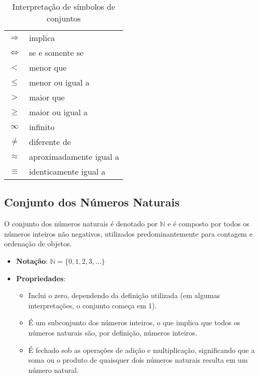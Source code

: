 \documentclass[a4paper,12pt]{article}  %
\begin{document}
\begin{table}[h]
\begin{tabularx}{\textwidth}{|c|X|}
        \( \Rightarrow \)     & implica                         \\
        \( \Leftrightarrow \) & se e somente se                 \\
        \( < \)               & menor que                       \\
        \( \leq \)            & menor ou igual a                \\
        \( > \)               & maior que                       \\
        \( \geq \)            & maior ou igual a                \\
        \( \infty \)          & infinito                        \\
        \( \neq \)            & diferente de                    \\
        \( \approx \)         & aproximadamente igual a         \\
        \( \equiv \)          & identicamente igual a           \\
        \hline
    \end{tabularx}
    \caption{Interpretação de símbolos de conjuntos}
\end{table}


\subsection{Conjunto dos Números Naturais}
O conjunto dos números naturais é denotado por \( \mathbb{N} \) e é composto por todos os números inteiros não negativos, utilizados predominantemente para contagem e ordenação de objetos.

\begin{itemize}
    \item \textbf{Notação}: \( \mathbb{N} = \{0, 1, 2, 3, \ldots\} \)
    \item \textbf{Propriedades}:
          \begin{itemize}
              \item Inclui o zero, dependendo da definição utilizada (em algumas interpretações, o conjunto começa em 1).
              \item É um subconjunto dos números inteiros, o que implica que todos os números naturais são, por definição, números inteiros.
              \item É fechado sob as operações de adição e multiplicação, significando que a soma ou o produto de quaisquer dois números naturais resulta em um número natural.
          \end{itemize}
\end{itemize}
\end{document}
